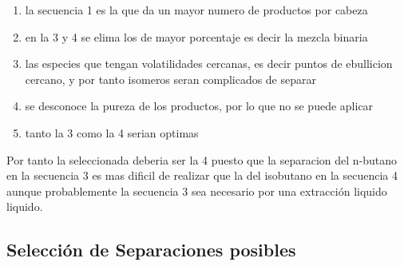 \documentclass{report}
\begin{document}
\begin{raggedright}
{\begin{enumerate}
		\item la secuencia 1 es la que da un mayor numero de productos por cabeza
		\item en la 3 y 4 se elima los de mayor porcentaje es decir la mezcla binaria
		\item las especies que tengan volatilidades cercanas, es decir puntos de ebullicion cercano, y por tanto isomeros seran complicados de separar
		\item se desconoce la pureza de los productos, por lo que no se puede aplicar
		\item tanto la 3 como la 4 serian optimas
	\end{enumerate}
	Por tanto la seleccionada deberia ser la 4 puesto que la separacion del n-butano en la secuencia 3 es mas dificil de realizar que la del isobutano en la secuencia 4 aunque probablemente la secuencia 3 sea necesario por una extracción liquido liquido.}
\end{raggedright}
\subsection{Selección de Separaciones posibles}
\end{document}
